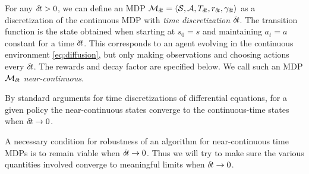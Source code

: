 For any ${\delta\hspace{-.1em}t}>0$, we can define an MDP ${\cal
M}_{\delta\hspace{-.1em}t} = \langle {\cal S}, {\cal A}, T_{{\delta\hspace{-.1em}t}}, r_{\delta\hspace{-.1em}t},
      \gamma_{\delta\hspace{-.1em}t}\rangle$ as a discretization of the continuous MDP with
      \emph{time discretization} ${\delta\hspace{-.1em}t}$. The %
      transition function
      is %
      the
      state obtained
      when starting at $s_0 = s$ and maintaining $a_t=a$ constant for a time
      ${\delta\hspace{-.1em}t}$.
      This corresponds to an agent evolving in the continuous
      environment \eqref{eq:diffusion}, but 
      only making observations and choosing actions every ${\delta\hspace{-.1em}t}$. The
      rewards and decay factor are specified below. We
      call such an  MDP ${\cal M}_{\delta\hspace{-.1em}t}$
      \emph{near-continuous}.      %


By standard arguments for time discretizations of differential
equations, for a given policy the near-continuous states converge to the
continuous-time states when ${\delta\hspace{-.1em}t}\to 0$. %

A necessary condition for robustness of an algorithm for
near-continuous time MDPs is 
to remain viable when ${\delta\hspace{-.1em}t} \rightarrow 0$. Thus we will try to
make sure the various quantities involved converge to meaningful
limits when ${\delta\hspace{-.1em}t}\to 0$.

% 
      

